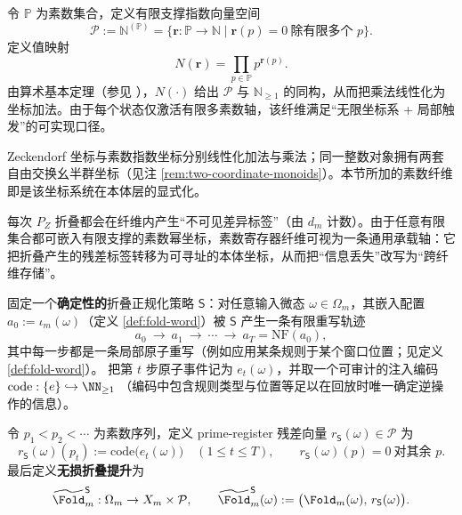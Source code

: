 \begin{definition}\label{def:pom-prime-fiber}
令 $\mathbb{P}$ 为素数集合，定义有限支撑指数向量空间
\[
\mathcal{P}:=\mathbb{N}^{(\mathbb{P})}=\{\mathbf{r}:\mathbb{P}\to\mathbb{N}\mid \mathbf{r}(p)=0\ \text{除有限多个 }p\}.
\]
定义值映射
\[
N(\mathbf{r})=\prod_{p\in\mathbb{P}} p^{\mathbf{r}(p)}.
\]
由算术基本定理（参见 \cite{Apostol1976}），$N(\cdot)$ 给出 $\mathcal{P}$ 与 $\mathbb{N}_{\ge 1}$ 的同构，从而把乘法线性化为坐标加法。由于每个状态仅激活有限多素数轴，该纤维满足“无限坐标系 + 局部触发”的可实现口径。
\end{definition}

\begin{remark}[两套自由交换幺半群坐标的并存]\label{rem:pom-two-monoids}
Zeckendorf 坐标与素数指数坐标分别线性化加法与乘法；同一整数对象拥有两套自由交换幺半群坐标（见注 \ref{rem:two-coordinate-monoids}）。本节所加的素数纤维即是该坐标系统在本体层的显式化。
\end{remark}

\begin{remark}[折叠残差的素数承载]\label{rem:pom-prime-carry}
每次 $P_Z$ 折叠都会在纤维内产生“不可见差异标签”（由 $d_m$ 计数）。由于任意有限集合都可嵌入有限支撑的素数幂坐标，素数寄存器纤维可视为一条通用承载轴：它把折叠产生的残差标签转移为可寻址的本体坐标，从而把“信息丢失”改写为“跨纤维存储”。
\end{remark}

\begin{definition}\label{def:pom-fold-prime-lift}
固定一个\textbf{确定性的}折叠正规化策略 \(\mathsf{S}\)：对任意输入微态 \(\omega\in\Omega_m\)，其嵌入配置 \(a_0:=\iota_m(\omega)\)（定义 \ref{def:fold-word}）被 \(\mathsf{S}\) 产生一条有限重写轨迹
\[
a_0\ \to\ a_1\ \to\ \cdots\ \to\ a_T=\mathrm{NF}(a_0),
\]
其中每一步都是一条局部原子重写（例如应用某条规则于某个窗口位置；见定义 \ref{def:fold-word}）。
把第 \(t\) 步原子事件记为 \(e_t(\omega)\)，并取一个可审计的注入编码
\(
\mathrm{code}:\{e\}\hookrightarrow\NN_{\ge 1}
\)
（编码中包含规则类型与位置等足以在回放时唯一确定逆操作的信息）。
\par
令 \(p_1<p_2<\cdots\) 为素数序列，定义 prime-register 残差向量 \(r_{\mathsf S}(\omega)\in\mathcal P\) 为
\[
r_{\mathsf S}(\omega)(p_t):=\mathrm{code}\bigl(e_t(\omega)\bigr)\quad(1\le t\le T),
\qquad
r_{\mathsf S}(\omega)(p)=0\ \text{对其余 }p.
\]
最后定义\textbf{无损折叠提升}为
\[
\widetilde{\Fold}^{\mathsf S}_m:\Omega_m\to X_m\times\mathcal P,
\qquad
\widetilde{\Fold}^{\mathsf S}_m(\omega):=\bigl(\Fold_m(\omega),\,r_{\mathsf S}(\omega)\bigr).
\]
\end{definition}

